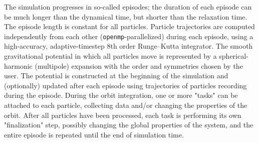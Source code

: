 \documentclass[12pt]{article}
\begin{document}
The simulation progresses in so-called episodes; the duration of each episode can be much longer than the dynamical time, but shorter than the relaxation time. The episode length is constant for all particles. %
Particle trajectories are computed independently from each other (\texttt{openmp}-parallelized) during each episode, using a high-accuracy, adaptive-timestep 8th order Runge--Kutta integrator.
The smooth gravitational potential in which all particles move is represented by a spherical-harmonic (multipole) expansion with the order and symmetries chosen by the user.
The potential is constructed at the beginning of the simulation and (optionally) updated after each episode using trajectories of particles recording during the episode. 
During the orbit integration, one or more "tasks" can be attached to each particle, collecting data and/or changing the properties of the orbit. After all particles have been processed, each task is performing its own "finalization" step, possibly changing the global properties of the system, and the entire episode is repeated until the end of simulation time.
\end{document}
